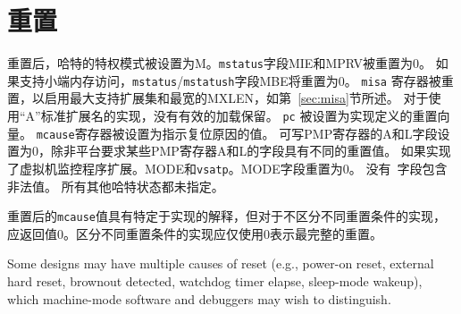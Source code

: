 {%
\section{重置}
\label{sec:reset}

\iffalse
Upon reset, a hart's privilege mode is set to M.  The {\tt mstatus} fields MIE
and MPRV are reset to 0.
If little-endian memory accesses are supported, the {\tt mstatus}/{\tt mstatush}
field MBE is reset to 0.
The {\tt misa} register is reset to enable the maximal set of supported
extensions and widest MXLEN, as described in Section~\ref{sec:misa}.
For implementations with the ``A'' standard extension, there is no valid load
reservation.
The {\tt pc} is set to an implementation-defined
reset vector.  The {\tt mcause} register is set to a value indicating the
cause of the reset.
Writable PMP registers' A and L fields are set to 0, unless the platform
mandates a different reset value for some PMP registers' A and L fields.
If the hypervisor extension is implemented, the {\tt hgatp}.MODE and
{\tt vsatp}.MODE fields are reset to 0.
No \warl\ field contains an illegal value.
All other hart state is \unspecified.

The {\tt mcause} values after reset have implementation-specific
interpretation, but the value 0 should be returned on implementations
that do not distinguish different reset conditions. Implementations
that distinguish different reset conditions should only use 0 to
indicate the most complete reset.
\fi
重置后，哈特的特权模式被设置为M。{\tt mstatus}字段MIE和MPRV被重置为0。
如果支持小端内存访问，{\tt mstatus}/{\tt mstatush}字段MBE将重置为0。
{\tt misa} 寄存器被重置，以启用最大支持扩展集和最宽的MXLEN，如第~\ref{sec:misa}节所述。
对于使用“A”标准扩展名的实现，没有有效的加载保留。
{\tt pc} 被设置为实现定义的重置向量。 {\tt mcause}寄存器被设置为指示复位原因的值。
可写PMP寄存器的A和L字段设置为0，除非平台要求某些PMP寄存器A和L的字段具有不同的重置值。
如果实现了虚拟机监控程序扩展。MODE和{\tt vsatp}。MODE字段重置为0。
没有\warl\ 字段包含非法值。
所有其他哈特状态都未指定。

重置后的{\tt mcause}值具有特定于实现的解释，但对于不区分不同重置条件的实现，应返回值0。区分不同重置条件的实现应仅使用0表示最完整的重置。

\iffalse
\begin{commentary}
Some designs may have multiple causes of reset (e.g., power-on reset,
external hard reset, brownout detected, watchdog timer elapse,
sleep-mode wakeup), which machine-mode software and debuggers may wish
to distinguish.


\end{commentary}}
